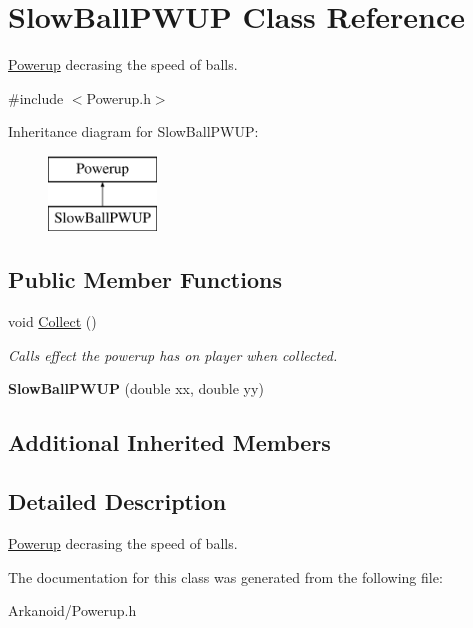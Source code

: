 \hypertarget{class_slow_ball_p_w_u_p}{}\section{Slow\+Ball\+P\+W\+UP Class Reference}
\label{class_slow_ball_p_w_u_p}


\hyperlink{class_powerup}{Powerup} decrasing the speed of balls.  




{\ttfamily \#include $<$Powerup.\+h$>$}

Inheritance diagram for Slow\+Ball\+P\+W\+UP\+:\begin{figure}[H]
\begin{center}
\leavevmode
\includegraphics[height=2.000000cm]{class_slow_ball_p_w_u_p}
\end{center}
\end{figure}
\subsection*{Public Member Functions}
\begin{DoxyCompactItemize}
\item 
\mbox{\label{class_slow_ball_p_w_u_p_ad1cd4576b80a5e33abb11e77482cf9c8}} 
void \hyperlink{class_slow_ball_p_w_u_p_ad1cd4576b80a5e33abb11e77482cf9c8}{Collect} ()
\begin{DoxyCompactList}\small\item\em Calls effect the powerup has on player when collected. \end{DoxyCompactList}\item 
\mbox{\label{class_slow_ball_p_w_u_p_ad4454483d00e04e90b54f5439b64e0b1}} 
{\bfseries Slow\+Ball\+P\+W\+UP} (double xx, double yy)
\end{DoxyCompactItemize}
\subsection*{Additional Inherited Members}


\subsection{Detailed Description}
\hyperlink{class_powerup}{Powerup} decrasing the speed of balls. 

The documentation for this class was generated from the following file\+:\begin{DoxyCompactItemize}
\item 
Arkanoid/Powerup.\+h\end{DoxyCompactItemize}
